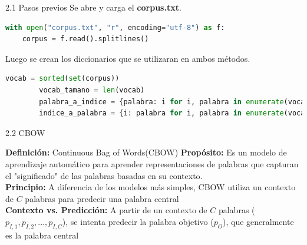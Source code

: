 \documentclass{beamer}
\begin{document}
	
\begin{frame}[fragile]{2.1 Pasos previos}
	\justifying
	Se abre y carga el \textbf{corpus.txt}.
	
	\begin{lstlisting}[language=Python]
with open("corpus.txt", "r", encoding="utf-8") as f:
	corpus = f.read().splitlines()
	\end{lstlisting}
	Luego se crean los diccionarios que se utilizaran en ambos métodos.
	\begin{lstlisting}[language=Python]
    vocab = sorted(set(corpus))
		vocab_tamano = len(vocab)
		palabra_a_indice = {palabra: i for i, palabra in enumerate(vocab)}
		indice_a_palabra = {i: palabra for i, palabra in enumerate(vocab)}
	\end{lstlisting}

\end{frame}
	
\begin{frame}[fragile]{2.2 CBOW}
	\begin{block}{\textbf{Definición:} Continuous Bag of Words(CBOW)}
	\justifying
	\vspace{0.1cm}
	\textbf{Propósito:} Es un modelo de aprendizaje automático para aprender representaciones de palabras que capturan el "significado" de las palabras basadas en su contexto.\\
	\vspace{0.1cm}
	\textbf{Principio:} A diferencia de los modelos más simples, CBOW utiliza un contexto de $C$ palabras para predecir una palabra central\\
	\vspace{0.1cm}
	\textbf{Contexto vs. Predicción:}  A partir de un contexto de $C$ palabras ($p_{I,1}, p_{I,2}, ..., p_{I,C}$), se intenta predecir la palabra objetivo ($p_O$), que generalmente es la palabra central
	\end{block}
	
\end{frame}
	
\end{document}
